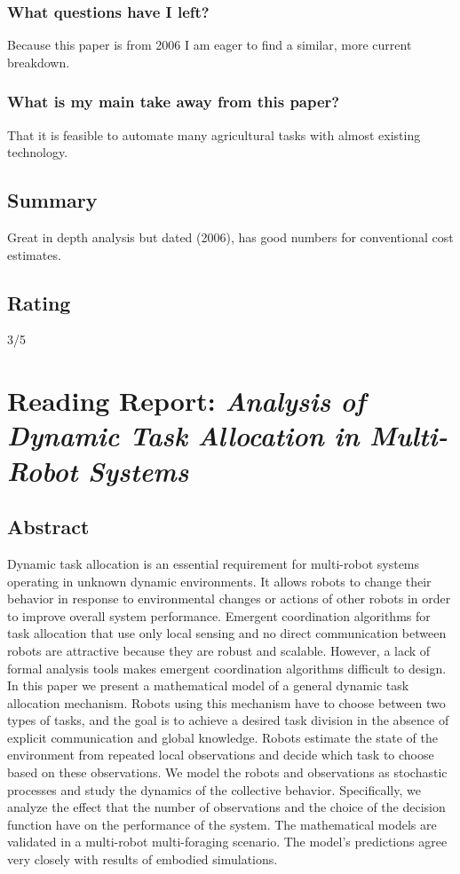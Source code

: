     \subsubsection*{What questions have I left?}
    Because this paper is from 2006 I am eager to find a similar, more current breakdown.
    \subsubsection*{What is my main take away from this paper?}
    That it is feasible to automate many agricultural tasks with almost existing technology.
    
    \subsection*{Summary}
    Great in depth analysis but dated (2006), has good numbers for conventional cost estimates.
    \subsection*{Rating}
    3/5
    
    \newpage
    \section{Reading Report: \emph{Analysis of Dynamic Task Allocation in Multi-Robot Systems
    }}
    \cite{Lerman2006}
    
    \subsection*{Abstract}
    Dynamic task allocation is an essential requirement for multi-robot
    systems operating in unknown dynamic environments. It allows
    robots to change their behavior in response to environmental changes
    or actions of other robots in order to improve overall system performance. Emergent coordination algorithms for task allocation that
    use only local sensing and no direct communication between robots
    are attractive because they are robust and scalable. However, a lack
    of formal analysis tools makes emergent coordination algorithms
    difficult to design. In this paper we present a mathematical model
    of a general dynamic task allocation mechanism. Robots using this
    mechanism have to choose between two types of tasks, and the goal
    is to achieve a desired task division in the absence of explicit communication and global knowledge. Robots estimate the state of the
    environment from repeated local observations and decide which task
    to choose based on these observations. We model the robots and observations as stochastic processes and study the dynamics of the collective behavior. Specifically, we analyze the effect that the number
    of observations and the choice of the decision function have on the
    performance of the system. The mathematical models are validated
    in a multi-robot multi-foraging scenario. The model’s predictions
    agree very closely with results of embodied simulations.
    
